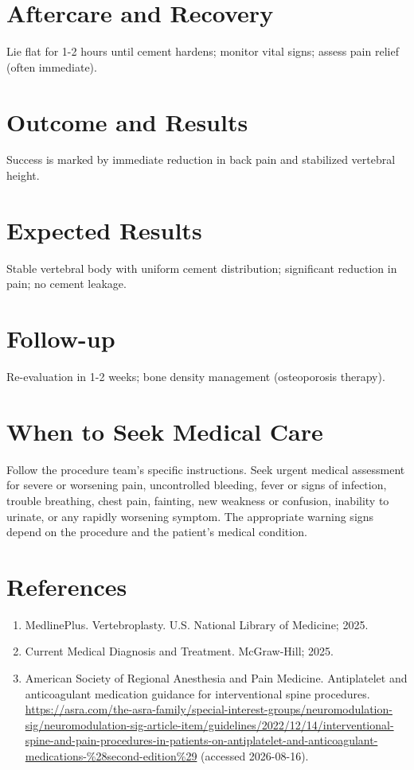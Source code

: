 \section*{Aftercare and Recovery}
Lie flat for 1-2 hours until cement hardens; monitor vital signs; assess pain relief (often immediate).

\section*{Outcome and Results}
Success is marked by immediate reduction in back pain and stabilized vertebral height.

\section*{Expected Results}
Stable vertebral body with uniform cement distribution; significant reduction in pain; no cement leakage.

\section*{Follow-up}
Re-evaluation in 1-2 weeks; bone density management (osteoporosis therapy).

\section*{When to Seek Medical Care}
Follow the procedure team's specific instructions. Seek urgent medical assessment for severe or worsening pain, uncontrolled bleeding, fever or signs of infection, trouble breathing, chest pain, fainting, new weakness or confusion, inability to urinate, or any rapidly worsening symptom. The appropriate warning signs depend on the procedure and the patient's medical condition.

\section*{References}
\begin{enumerate}
  \item MedlinePlus. Vertebroplasty. U.S. National Library of Medicine; 2025.
  \item Current Medical Diagnosis and Treatment. McGraw-Hill; 2025.
  \item American Society of Regional Anesthesia and Pain Medicine. Antiplatelet and anticoagulant medication guidance for interventional spine procedures. \url{https://asra.com/the-asra-family/special-interest-groups/neuromodulation-sig/neuromodulation-sig-article-item/guidelines/2022/12/14/interventional-spine-and-pain-procedures-in-patients-on-antiplatelet-and-anticoagulant-medications-%28second-edition%29} (accessed 2026-08-16).
\end{enumerate}

\clearpage
